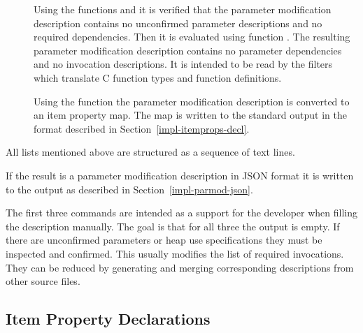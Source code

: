\begin{description}
\item[]
Using the functions  and  it is verified that the parameter modification 
description contains no
unconfirmed parameter descriptions and no required dependencies. Then it is evaluated using function .
The resulting parameter modification description contains no parameter dependencies and
no invocation descriptions. It is intended to be read by the filters which translate C function types and function 
definitions.

\item[]
Using the function  the parameter modification description is converted to an item property 
map. The map is written to the standard output in the format described in Section~\ref{impl-itemprops-decl}.
\end{description}

All lists mentioned above are structured as a sequence of text lines.

If the result is a parameter modification description in JSON format it is written to the output as described in 
Section~\ref{impl-parmod-json}.

The first three commands are intended as a support for the developer when filling the description manually. The goal is that
for all three the output is empty. If there are unconfirmed parameters or heap use specifications they must be inspected and confirmed. This usually 
modifies the list of required invocations. They can be reduced by generating and merging corresponding descriptions
from other source files.

\subsection{Item Property Declarations}
\label{impl-ocomps-items}

